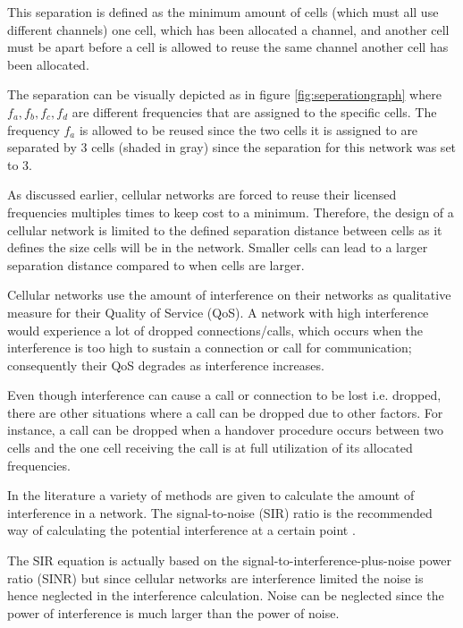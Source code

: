 This separation is defined as the minimum amount of cells (which must all use different channels) one cell, which has been allocated a channel, and another cell must be apart before a cell is allowed to reuse the same channel another cell has been allocated\cite{WirelessCommunications,WirelessDigitalCommunications,Eisenblatter,InterferenceOrientatedFAP}. 

The separation can be visually depicted as in figure \ref{fig:seperationgraph} where $f_a,f_b,f_c,f_d$ are different frequencies that are assigned to the specific cells. The frequency $f_a$ is allowed to be reused since the two cells it is assigned to are separated by 3 cells (shaded in gray) since the separation for this network was set to 3.

As discussed earlier, cellular networks are forced to reuse their licensed frequencies multiples times to keep cost to a minimum. Therefore, the design of a cellular network is limited to the defined separation distance between cells as it defines the size cells will be in the network. Smaller cells can lead to a larger separation distance compared to when cells are larger\cite{WirelessCommunications,WirelessDigitalCommunications,Eisenblatter,InterferenceOrientatedFAP}.

Cellular networks use the amount of interference on their networks as qualitative measure for their Quality of Service (QoS). A network with high interference would experience a lot of dropped connections/calls, which occurs when the interference is too high to sustain a connection or call for communication; consequently their QoS degrades as interference increases\cite{WirelessCommunications,WirelessDigitalCommunications}.

Even though interference can cause a call or connection to be lost i.e. dropped, there are other situations where a call can be dropped due to other factors. For instance, a call can be dropped when a handover procedure occurs between two cells and the one cell receiving the call is at full utilization of its allocated frequencies\cite{GSMSysEngin,WirelessCommunications,WirelessDigitalCommunications}.

In the literature a variety of methods are given to calculate the amount of interference in a network. The signal-to-noise (SIR) ratio is the recommended way of calculating the potential interference at a certain point \cite{Karen2004}. 

The SIR equation is actually based on the signal-to-interference-plus-noise power ratio (SINR) but since cellular networks are interference limited the noise is hence neglected in the interference calculation\cite{WirelessCommunications}. Noise can be neglected since the power of interference is much larger than the power of noise\cite{WirelessCommunications,WirelessDigitalCommunications}.

